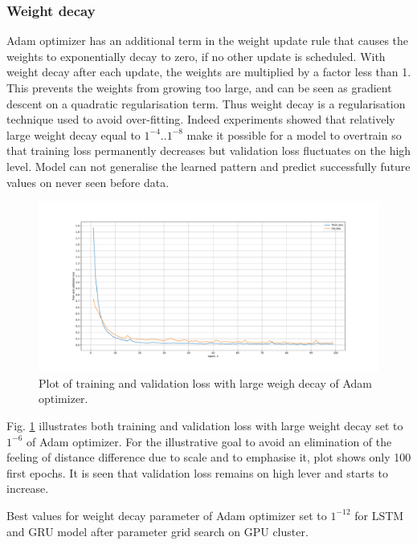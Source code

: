 \subsubsection{Weight decay}
Adam optimizer has an additional term in the weight update rule that causes the weights to exponentially decay to zero, if no other update is scheduled. With weight decay after each update, the weights are multiplied by a factor less than 1. This prevents the weights from growing too large, and can be seen as gradient descent on a quadratic regularisation term. Thus weight decay is a regularisation technique used to avoid over-fitting. Indeed experiments showed that relatively large weight decay equal to $1^{-4} .. 1^{-8}$ make it possible for a model to overtrain so that training loss permanently decreases but validation loss fluctuates on the high level. Model can not generalise the learned pattern and predict successfully future values on never seen before data. 
\begin{figure}[htb]
	\begin{center}
		\includegraphics[width=1\textwidth, keepaspectratio]{gfx/lstm1_weight_decay_high.pdf}
		\caption{\label{fig:wd} Plot of training and validation loss with large weigh decay of Adam optimizer.}
	\end{center}
\end{figure}

Fig. \ref{fig:wd} illustrates both training and validation loss with large weight decay set to $1^{-6}$ of Adam optimizer. For the illustrative goal to avoid an elimination of the feeling of distance difference due to scale and to emphasise it, plot shows only 100 first epochs. It is seen that validation loss remains on high lever and starts to increase.

Best values for weight decay parameter of Adam optimizer set to $1^{-12}$ for LSTM and GRU model after parameter grid search on GPU cluster.

